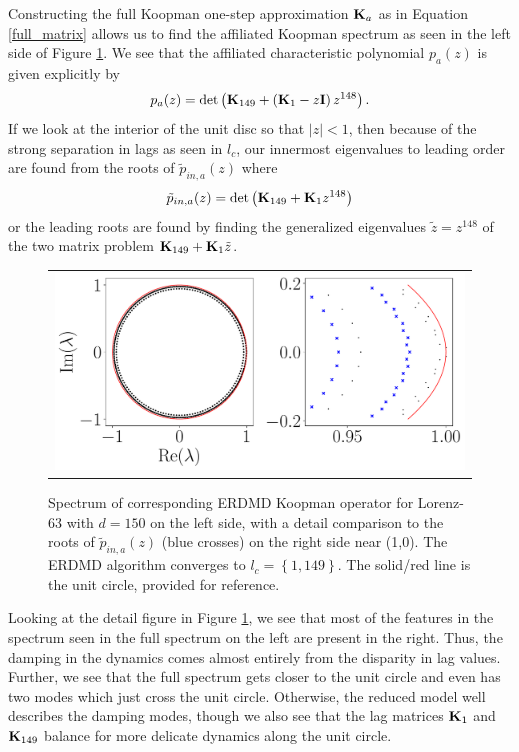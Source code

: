 \documentclass[a4paper,11pt]{article}
\begin{document}
Constructing the full Koopman one-step approximation ${\bf K}_{a}$ as in Equation \eqref{full_matrix} allows us to find the affiliated Koopman spectrum as seen in the left side of Figure \ref{fig:lorenz_spectrum_d_150}.  We see that the affiliated characteristic polynomial $p_{a}(z)$ is given explicitly by
\[
p_{a}(z) = \text{det}\left({\bf K}_{149} + \left({\bf K}_{1}-z{\bf I}\right)z^{148} \right).
\]
If we look at the interior of the unit disc so that $|z|<1$, then because of the strong separation in lags as seen in $l_{c}$, our innermost eigenvalues to leading order are found from the roots of $\tilde{p}_{in, a}(z)$ where
\[
\tilde{p}_{in, a}(z) = \text{det}\left({\bf K}_{149} + {\bf K}_{1}z^{148}\right)
\]
or the leading roots are found by finding the generalized eigenvalues $\tilde{z}=z^{148}$ of the two matrix problem ${\bf K}_{149} + {\bf K}_{1}\tilde{z}$.  
\begin{figure}[!h]
\centering
\begin{tabular}{c}
\includegraphics[width=1\textwidth]{Lorenz_detail_spectrum_w_mx_lag_149}
\end{tabular}
\caption{Spectrum of corresponding ERDMD Koopman operator for Lorenz-63 with $d=150$ on the left side, with a detail comparison to the roots of $\tilde{p}_{in, a}(z)$ (blue crosses) on the right side near (1,0).  The ERDMD algorithm converges to $l_{c}=\left\{1,149\right\}$.  The solid/red line is the unit circle, provided for reference.}
\label{fig:lorenz_spectrum_d_150}
\end{figure}

Looking at the detail figure in Figure \ref{fig:lorenz_spectrum_d_150}, we see that most of the features in the spectrum seen in the full spectrum on the left are present in the right.  Thus, the damping in the dynamics comes almost entirely from the disparity in lag values.  Further, we see that the full spectrum gets closer to the unit circle and even has two modes which just cross the unit circle.  Otherwise, the reduced model well describes the damping modes, though we also see that the lag matrices ${\bf K}_{1}$ and ${\bf K}_{149}$ balance for more delicate dynamics along the unit circle.    
\end{document}
